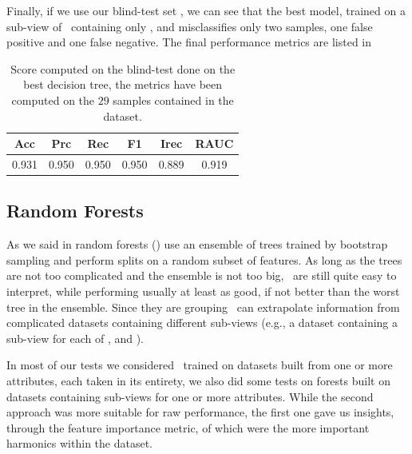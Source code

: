 Finally, if we use our blind-test set \db, we can see that the best model, trained on a sub-view of
\an\ containing only \an[2], and \an[12] misclassifies only two samples, one false positive and one
false negative. The final performance metrics are listed in 
\begin{table}[!ht]
	\caption{Score computed on the blind-test done on the best decision tree, the metrics have
		been computed on the $29$ samples contained in the dataset.}\label{tbl:blind-test-bdt}

	\bigskip
	\setlength{\tabcolsep}{6pt}
	\centering
	\begin{tabular}{cccccc}
		\toprule
		\textbf{Acc} & \textbf{Prc} & \textbf{Rec} & \textbf{F1} & \textbf{Irec} & \textbf{RAUC} \\
		\midrule
		0.931        & 0.950        & 0.950        & 0.950       & 0.889         & 0.919         \\
		\bottomrule
	\end{tabular}
\end{table}

\subsection{Random Forests}
\label{sec:qrp-rf}
As we said in  random forests (\rfs) use an ensemble of trees trained by bootstrap
sampling and perform splits on a random subset of features. As long as the trees are not too
complicated and the ensemble is not too big, \rfs\ are still quite easy to interpret, while
performing usually at least as good, if not better than the worst tree in the ensemble. Since they
are grouping \dts\ can extrapolate information from complicated datasets containing different
sub-views (e.g., a dataset containing a sub-view for each of \an, \bn and \cnmod).

In most of our tests we considered \rfs\ trained on datasets built from one or more attributes, each
taken in its entirety, we also did some tests on forests built on datasets containing sub-views for
one or more attributes. While the second approach was more suitable for raw performance, the first
one gave us insights, through the feature importance metric, of which were the more important
harmonics within the dataset.

